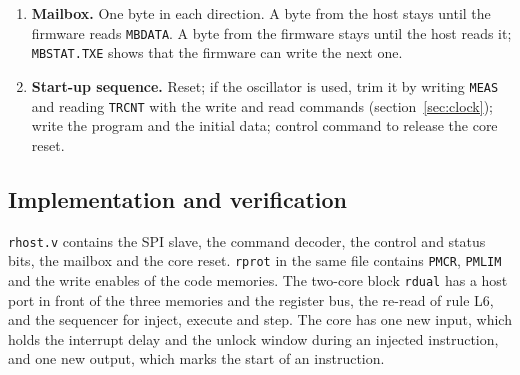 \documentclass[10pt,a4paper]{article}
\newcommand{\reg}[1]{\texttt{#1}}
\begin{document}
\begin{enumerate}[label=\textbf{L\arabic*},leftmargin=2.6em,start=5]
it, the core halts and its break flag is set. To continue, the host writes the original word back, sets the
halt request, executes \texttt{RJMP .-2}, and clears the halt request. Clearing a halt request clears the
break flag of that core.
\item \textbf{Mailbox.} One byte in each direction. A byte from the host stays until the firmware reads
\reg{MBDATA}. A byte from the firmware stays until the host reads it; \reg{MBSTAT.TXE} shows that the firmware
can write the next one.
\item \textbf{Start-up sequence.} Reset; if the oscillator is used, trim it by writing \reg{MEAS} and reading \reg{TRCNT} with the write and read commands (section~\ref{sec:clock});
write the program and the initial data; control command to release the core reset.
\end{enumerate}

\subsection{Implementation and verification}\label{sec:hostver}

\texttt{rhost.v} contains the SPI slave, the command decoder, the control and status bits, the mailbox and the
core reset. \texttt{rprot} in the same file contains \reg{PMCR}, \reg{PMLIM} and the write enables of the code
memories. The two-core block \texttt{rdual} has a host port in front of the three memories and the register
bus, the re-read of rule L6, and the sequencer for inject, execute and step. The core has one new input, which
holds the interrupt delay and the unlock window during an injected instruction, and one new output, which marks
the start of an instruction.
\end{document}

